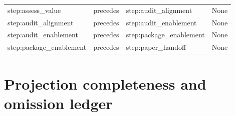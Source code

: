 \documentclass[10pt,a4paper]{article}
\begin{document}
\begin{longtable}{@{}>{\raggedright\arraybackslash}p{.24\linewidth}>{\raggedright\arraybackslash}p{.12\linewidth}>{\raggedright\arraybackslash}p{.24\linewidth}>{\raggedright\arraybackslash}p{.20\linewidth}@{}}
step:\allowbreak{}assess\_\allowbreak{}value & precedes & step:\allowbreak{}audit\_\allowbreak{}alignment & None\\
step:\allowbreak{}audit\_\allowbreak{}alignment & precedes & step:\allowbreak{}audit\_\allowbreak{}enablement\allowbreak{} & None\\
step:\allowbreak{}audit\_\allowbreak{}enablement\allowbreak{} & precedes & step:\allowbreak{}package\_\allowbreak{}enablement\allowbreak{} & None\\
step:\allowbreak{}package\_\allowbreak{}enablement\allowbreak{} & precedes & step:\allowbreak{}paper\_\allowbreak{}handoff & None\\
\bottomrule
\end{longtable}
\normalsize\endgroup
\section{Projection completeness and omission ledger}\label{app-dispositions}
\begingroup\setlength{\tabcolsep}{2pt}\small
\end{document}
